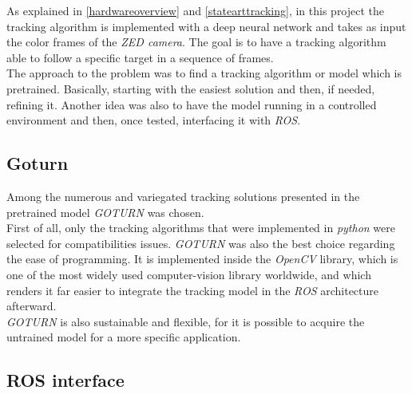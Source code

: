 		As explained in \vref{hardwareoverview} and \vref{statearttracking}, in this project
		the tracking algorithm is implemented with a deep neural network and takes as input
		the color frames of the \textit{ZED camera}. The goal is
		to have a tracking algorithm able to follow a specific target in 
		a sequence of frames.
		\\\indent The approach to the problem was to find a tracking algorithm or model 
		which is pretrained. Basically, starting with the easiest solution and 
		then, if needed, refining it. Another idea was also to 
		have the model running in a controlled environment and then, once tested, 
		interfacing it with \textit{ROS}.
		
		\subsection{Goturn}
		
		Among the numerous and variegated tracking solutions presented in 
		\cite{trakinglist} the pretrained model \textit{GOTURN} was chosen.
		\\\indent First of all, only the tracking algorithms that were
		implemented in \textit{python} were selected for compatibilities issues.
		\textit{GOTURN} was also the best choice regarding the ease of 
		programming. It is implemented inside the \textit{OpenCV}
		library, which is one of the most widely used
		computer-vision library worldwide, and which renders it far easier
		to integrate the tracking model in the \textit{ROS} architecture
		afterward. \cite{goturn}
		\\\indent \textit{GOTURN} is also sustainable and flexible, for it is
		possible to acquire the untrained model for a more 
		specific application.\cite{goturnpy}
		
		\subsection{ROS interface}
		

